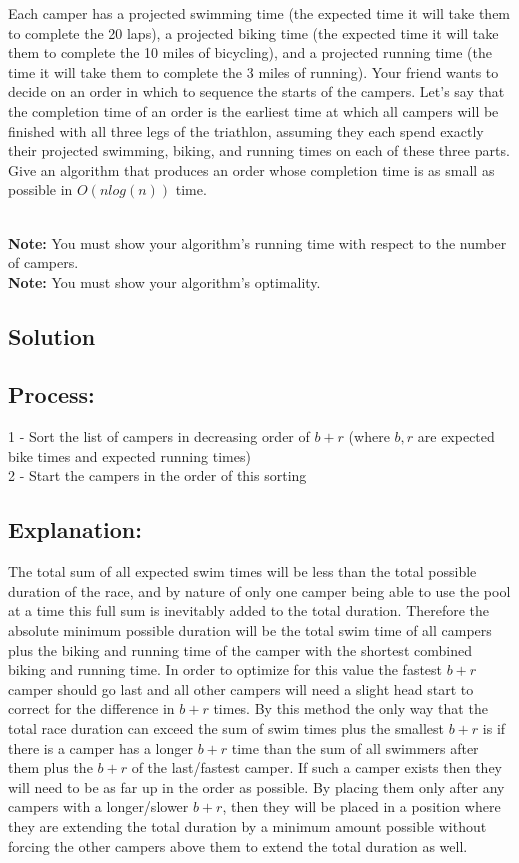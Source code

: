 \documentclass[11pt]{article}
\begin{document}
Each camper has a projected swimming time (the expected time it will take them to complete the 20 laps), a projected biking time (the expected time it will take them to complete the 10 miles of bicycling), and a projected running time (the time it will take them to complete the 3 miles of running). Your friend wants to decide on an order in which to sequence the starts of the campers. Let’s say that the completion time of an order is the earliest time at which all campers will be finished with all three legs of the triathlon, assuming they each spend exactly their projected swimming, biking, and running times on each of these three parts. Give an algorithm that produces an order whose completion time is as small as possible in $O(nlog(n))$ time.

~\\
\noindent
\textbf{Note:} You must show your algorithm's running time with respect to the number of campers. \\
\textbf{Note:} You must show your algorithm's optimality. \\


\subsection*{Solution}

\subsection*{Process:}
1 - Sort the list of campers in decreasing order of $b+r$ (where $b, r$ are expected bike times and expected running times)\\
2 - Start the campers in the order of this sorting

\subsection*{Explanation:}
The total sum of all expected swim times will be less than the total possible duration of the race, and by nature of only one camper being able to use the pool at a time this full sum is inevitably added to the total duration. Therefore the absolute minimum possible duration will be the total swim time of all campers plus the biking and running time of the camper with the shortest combined biking and running time. In order to optimize for this value the fastest $b+r$ camper should go last and all other campers will need a slight head start to correct for the difference in $b+r$ times. By this method the only way that the total race duration can exceed the sum of swim times plus the smallest $b+r$ is if there is a camper has a longer $b+r$ time than the sum of all swimmers after them plus the $b+r$ of the last/fastest camper. If such a camper exists then they will need to be as far up in the order as possible. By placing them only after any campers with a longer/slower $b+r$, then they will be placed in a position where they are extending the total duration by a minimum amount possible without forcing the other campers above them to extend the total duration as well.
\end{document}
